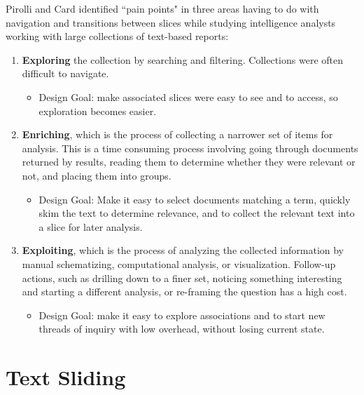 \documentclass{sig-alternate}
\newcommand{\strong}[1] {\textbf{#1}}
\begin{document}
Pirolli and Card \cite{pirolli_sensemaking_2005} identified ``pain points" in three areas having to do with navigation and transitions between slices while studying intelligence analysts working with large collections of text-based reports:
\begin{enumerate}
\item \strong{Exploring} the collection by searching and filtering. Collections were often difficult to navigate. 
	\begin{itemize}
		\item Design Goal: make associated slices were easy to see and to access, so exploration  becomes easier. 
	\end{itemize}
\item \strong{Enriching}, which is the process of collecting a narrower set of items for analysis. This is a time consuming process involving going through documents returned by results, reading them to determine whether they were relevant or not, and placing them into groups.
	\begin{itemize}
		\item Design Goal: Make it easy to select documents matching a term, quickly skim the text to determine relevance, and to collect the relevant text into a slice for later analysis.
	\end{itemize}
\item \strong{Exploiting}, which is the process of analyzing the collected information by manual schematizing, computational analysis, or visualization. Follow-up actions, such as drilling down to a finer set, noticing something interesting and starting a different analysis, or re-framing the question has a high cost.
	\begin{itemize}
		\item Design Goal: make it easy to explore associations and to start new threads of inquiry with low overhead,  without losing current state.
	\end{itemize}
\end{enumerate}





\section{Text Sliding}
\end{document}
